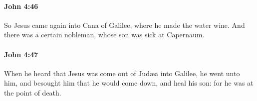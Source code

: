 		\paragraph{John 4:46} %
			\label{JOHN-4-46}

			So Jesus came again into Cana of Galilee, where he made the water wine. And there was a certain nobleman, whose son was sick at Capernaum.

			\begin{framed}
			\scriptsize
				\begin{compactdesc}
					\item[SBLG] 
				\end{compactdesc}
			\end{framed}

		\paragraph{John 4:47} %
			\label{JOHN-4-47}

			When he heard that Jesus was come out of Judæa into Galilee, he went unto him, and besought him that he would come down, and heal his son: for he was at the point of death.

